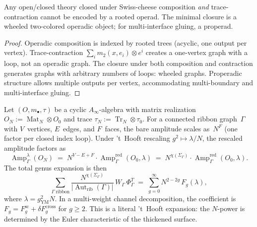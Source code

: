\begin{corollary}%
\label{cor:operads-too-small}%
%
Any open/closed theory closed under Swiss-cheese
composition \emph{and} trace-contraction cannot be
encoded by a rooted operad. The minimal closure is
a wheeled two-colored operadic object\textup;
for multi-interface gluing, a properad.
\end{corollary}

\begin{proof}
Operadic composition is indexed by rooted trees
\textup{(}acyclic, one output per vertex\textup{)}.
Trace-contraction $\sum_i m_2(x, e_i) \otimes e^i$
creates a one-vertex graph with a loop, not an operadic
graph. The closure under both composition and
contraction generates graphs with arbitrary numbers of
loops: wheeled graphs. Properadic structure allows
multiple outputs per vertex, accommodating
multi-boundary and multi-interface gluing.
\end{proof}

\begin{theorem}%
\label{thm:exact-n-chi-weighting}%
%
Let $(O, m_\bullet, \tau)$ be a cyclic
$A_\infty$-algebra with matrix realization
$O_N := \operatorname{Mat}_N \otimes O_0$ and trace
$\tau_N := \operatorname{Tr}_N \otimes \tau_0$.
For a connected ribbon graph~$\Gamma$ with
$V$~vertices, $E$~edges, and $F$~faces, the bare
amplitude scales as~$N^F$ \textup(one factor per
closed index loop\textup).
Under 't~Hooft rescaling
$g^2 \mapsto \lambda/N$, the rescaled amplitude
factors as
\begin{equation}\label{eq:n-chi-amplitude}
\operatorname{Amp}_\Gamma^{\lambda}(O_N)
\;=\;
N^{V - E + F}\cdot
\operatorname{Amp}_\Gamma^{\mathrm{red}}(O_0,\lambda)
\;=\;
N^{\chi(\Sigma_\Gamma)}\cdot
\operatorname{Amp}_\Gamma^{\mathrm{red}}(O_0,\lambda).
\end{equation}
The total genus expansion is then
\begin{equation}\label{eq:thooft-literal}
\sum_{\Gamma\;\text{ribbon}}
\frac{N^{\chi(\Sigma_\Gamma)}}{|\operatorname{Aut}_{\mathrm{rib}}(\Gamma)|}
\,W_\Gamma\,\Phi_\Gamma^T
\;=\;
\sum_{g=0}^\infty N^{2-2g}\,F_g(\lambda),
\end{equation}
where $\lambda = g_{\mathrm{YM}}^2 N$. In a multi-weight channel
decomposition, the coefficient is
$F_g=F_g^{\mathrm{sc}}+\delta F_g^{\mathrm{cross}}$ for
$g \geq 2$. This is a
literal 't~Hooft expansion\textup: the $N$-power
is determined by the Euler characteristic of the
thickened surface.
\end{theorem}

